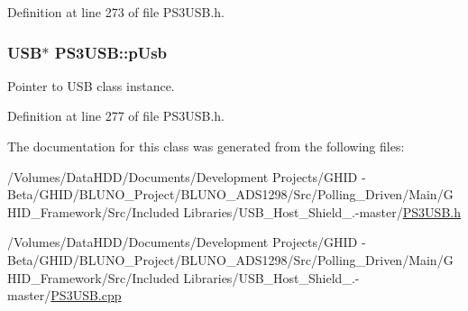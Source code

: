 \-Definition at line 273 of file \-P\-S3\-U\-S\-B.\-h.

\hypertarget{class_p_s3_u_s_b_aa1873f41ae0da7c4568cfb7517560c48}{
\subsubsection[{p\-Usb}]{\setlength{\rightskip}{0pt plus 5cm}\-U\-S\-B$\ast$ {\bf \-P\-S3\-U\-S\-B\-::p\-Usb}}}\label{class_p_s3_u_s_b_aa1873f41ae0da7c4568cfb7517560c48}
\-Pointer to \-U\-S\-B class instance. 

\-Definition at line 277 of file \-P\-S3\-U\-S\-B.\-h.



\-The documentation for this class was generated from the following files\-:\begin{DoxyCompactItemize}
\item 
/\-Volumes/\-Data\-H\-D\-D/\-Documents/\-Development Projects/\-G\-H\-I\-D -\/ Beta/\-G\-H\-I\-D/\-B\-L\-U\-N\-O\-\_\-\-Project/\-B\-L\-U\-N\-O\-\_\-\-A\-D\-S1298/\-Src/\-Polling\-\_\-\-Driven/\-Main/\-G\-H\-I\-D\-\_\-\-Framework/\-Src/\-Included Libraries/\-U\-S\-B\-\_\-\-Host\-\_\-\-Shield\-\_.-\/master/\hyperlink{_p_s3_u_s_b_8h}{\-P\-S3\-U\-S\-B.\-h}\item 
/\-Volumes/\-Data\-H\-D\-D/\-Documents/\-Development Projects/\-G\-H\-I\-D -\/ Beta/\-G\-H\-I\-D/\-B\-L\-U\-N\-O\-\_\-\-Project/\-B\-L\-U\-N\-O\-\_\-\-A\-D\-S1298/\-Src/\-Polling\-\_\-\-Driven/\-Main/\-G\-H\-I\-D\-\_\-\-Framework/\-Src/\-Included Libraries/\-U\-S\-B\-\_\-\-Host\-\_\-\-Shield\-\_.-\/master/\hyperlink{_p_s3_u_s_b_8cpp}{\-P\-S3\-U\-S\-B.\-cpp}\end{DoxyCompactItemize}
